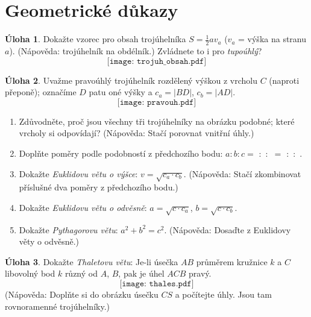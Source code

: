 \documentclass[10pt,a5paper]{extarticle}
\newcommand{\hint}[1]{{\color{gray}\footnotesize\noindent(Nápověda: #1)}}
\def\tisk{%
\newbox\shipouthackbox
\pdfpagewidth=2\pdfpagewidth
\let\oldshipout=\shipout
\def\shipout{\afterassignment\zdvojtmp \setbox\shipouthackbox=}%
\def\zdvojtmp{\aftergroup\zdvoj}%
\def\zdvoj{%
    \oldshipout\vbox{\hbox{%
        \copy\shipouthackbox
        \hskip\dimexpr .5\pdfpagewidth-\wd\shipouthackbox\relax
        \box\shipouthackbox
    }}%
}}%
\let\results\newpage
\let\endresults\relax
\def\resultssame{%
    \long\def\results##1\endresults{%
        \vfill\noindent\rotatebox{180}{\vbox{##1}}%
    }%
}
\theoremstyle{definition}
\newtheorem{uloha}{\atr Úloha}
\def\atr{}
\begin{document}


\section*{Geometrické důkazy}


\begin{uloha}
Dokažte vzorec pro obsah trojúhelníka $S = \frac12 a v_a$ ($v_a$ = výška na stranu $a$). \hint{ trojúhelník na obdélník.} Zvládnete to i pro \emph{tupoúhlý}?
\[ \texttt{[image: trojuh\_obsah.pdf]} \]
\end{uloha}


\begin{uloha}
Uvažme pravoúhlý trojúhelník rozdělený výškou z vrcholu $C$ (naproti přeponě); označíme $D$ patu oné výšky a $c_a = |BD|$, $c_b = |AD|$.
\[ \texttt{[image: pravouh.pdf]} \]
\begin{enumerate}
    \item Zdůvodněte, proč jsou všechny tři trojúhelníky na obrázku podobné; které vrcholy si odpovídají? \hint{Stačí porovnat vnitřní úhly.}
    \item Doplňte poměry podle podobností z předchozího bodu: $a:b:c = \boxed{\phantom{i}}:\boxed{\phantom{i}}:\boxed{\phantom{i}} = \boxed{\phantom{i}}:\boxed{\phantom{i}}:\boxed{\phantom{i}}$.
    \item Dokažte \emph{Euklidovu větu o výšce}: $v = \sqrt{c_a \cdot c_b}$. \hint{Stačí zkombinovat příslušné dva poměry z předchozího bodu.}
    \item Dokažte \emph{Euklidovu větu o odvěsně}: $a = \sqrt{c \cdot c_a}$, $b = \sqrt{c \cdot c_b}$.
    \item Dokažte \emph{Pythagorovu větu}: $a^2 + b^2 = c^2$. \hint{Dosaďte z Euklidovy věty o odvěsně.}
\end{enumerate}
\end{uloha}

\begin{uloha}
Dokažte \emph{Thaletovu větu}: Je-li úsečka $AB$ průměrem kružnice $k$ a $C$ libovolný bod $k$ různý od $A$, $B$, pak je úhel $ACB$ pravý.
\[ \texttt{[image: thales.pdf]} \]
\hint{Doplňte si do obrázku úsečku $CS$ a počítejte úhly. Jsou tam rovnoramenné trojúhelníky.}
\end{uloha}
\end{document}
